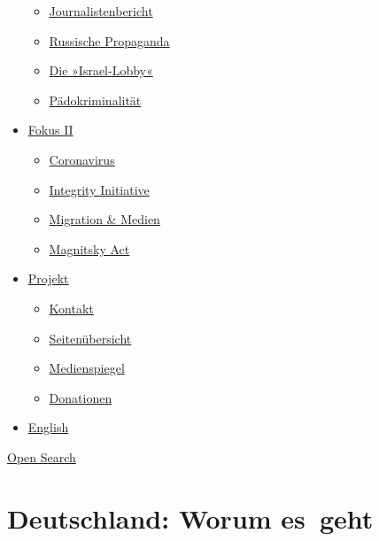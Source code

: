 \begin{itemize}
  \begin{itemize}
  \tightlist
  \item
    \href{https://swprs.org/bericht-eines-journalisten/}{Journalistenbericht}
  \item
    \href{https://swprs.org/russische-propaganda/}{Russische Propaganda}
  \item
    \href{https://swprs.org/die-israel-lobby-fakten-und-mythen/}{Die
    »Israel-Lobby«}
  \item
    \href{https://swprs.org/geopolitik-und-paedokriminalitaet/}{Pädokriminalität}
  \end{itemize}
\item
  \href{https://swprs.org/migration-und-medien/}{Fokus II}

  \begin{itemize}
  \tightlist
  \item
    \href{https://swprs.org/covid-19-hinweis-ii/}{Coronavirus}
  \item
    \href{https://swprs.org/die-integrity-initiative/}{Integrity
    Initiative}
  \item
    \href{https://swprs.org/migration-und-medien/}{Migration \& Medien}
  \item
    \href{https://swprs.org/der-fall-magnitsky/}{Magnitsky Act}
  \end{itemize}
\item
  \href{https://swprs.org/kontakt/}{Projekt}

  \begin{itemize}
  \tightlist
  \item
    \href{https://swprs.org/kontakt/}{Kontakt}
  \item
    \href{https://swprs.org/uebersicht/}{Seitenübersicht}
  \item
    \href{https://swprs.org/medienspiegel/}{Medienspiegel}
  \item
    \href{https://swprs.org/donationen/}{Donationen}
  \end{itemize}
\item
  \href{https://swprs.org/contact/}{English}
\end{itemize}

\protect\hyperlink{}{Open Search}

\hypertarget{deutschland-worum-es-geht}{%
\section{Deutschland: Worum es~geht}\label{deutschland-worum-es-geht}}

